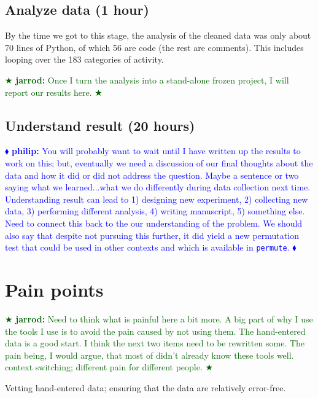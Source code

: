 \documentclass[]{article}
\newcommand{\philip}[1] { \textcolor{blue} {
\ensuremath{\blacklozenge} {\bf philip:}  {#1}
\ensuremath{\blacklozenge} } }
\newcommand{\jarrod}[1] { \textcolor{darkgreen} {
\ensuremath{\bigstar} {\bf jarrod:}  {#1}
\ensuremath{\bigstar} } }
\begin{document}
\subsection{Analyze data (1 hour)}

By the time we got to this stage, the analysis of the cleaned data was only
about 70 lines of Python, of which 56 are code (the rest are comments).
This includes looping over the 183 categories of activity.

\jarrod{Once I turn the analysis into a stand-alone frozen project, I
will report our results here.}

\subsection{Understand result (20 hours)}

\philip{You will probably want to wait until I have written up the results to
work on this; but, eventually we need a discussion of our final thoughts about
the data and how it did or did not address the question.  Maybe a sentence or
two saying what we learned...what we do differently during data collection next
time.  Understanding result can lead to 1) designing new experiment, 2)
collecting new data, 3) performing different analysis, 4) writing manuscript,
5) something else.  Need to connect this back to the our understanding of the
problem.  We should also say that despite not pursuing this further, it did
yield a new permutation test that could be used in other contexts and which is
available in \texttt{permute}.  }

\section{Pain points}\label{pain-points}


\jarrod{Need to think what is painful here a bit more. A big part of 
why I use the tools I use is to avoid the pain caused by not using
them.  The hand-entered data is a good start.  I think the next
two items need to be rewritten some.  The pain being, I would argue,
that most of didn't already know these tools well.
context switching; different pain for different people.} 

Vetting hand-entered data; ensuring that the data are relatively
error-free.
\end{document}
